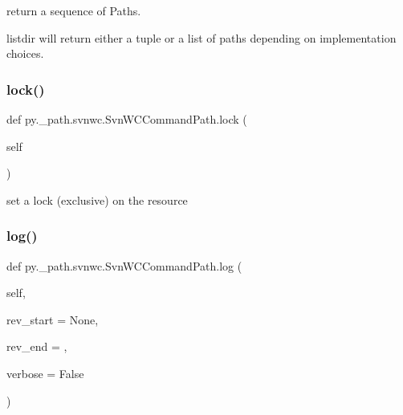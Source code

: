 \begin{DoxyVerb}return a sequence of Paths.

listdir will return either a tuple or a list of paths
depending on implementation choices.
\end{DoxyVerb}
 \mbox{\label{classpy_1_1__path_1_1svnwc_1_1_svn_w_c_command_path_a92949f6ea9e4dfbf5110454debc1918d}} 
\subsubsection{\texorpdfstring{lock()}{lock()}}
{\footnotesize\ttfamily def py.\+\_\+path.\+svnwc.\+Svn\+W\+C\+Command\+Path.\+lock (\begin{DoxyParamCaption}\item[{}]{self }\end{DoxyParamCaption})}

\begin{DoxyVerb}set a lock (exclusive) on the resource \end{DoxyVerb}
 \mbox{\label{classpy_1_1__path_1_1svnwc_1_1_svn_w_c_command_path_a2a4b4c81cf18c4d6c4e5519282b7b0a0}} 
\subsubsection{\texorpdfstring{log()}{log()}}
{\footnotesize\ttfamily def py.\+\_\+path.\+svnwc.\+Svn\+W\+C\+Command\+Path.\+log (\begin{DoxyParamCaption}\item[{}]{self,  }\item[{}]{rev\+\_\+start = {\ttfamily None},  }\item[{}]{rev\+\_\+end = {},  }\item[{}]{verbose = {\ttfamily False} }\end{DoxyParamCaption})}

